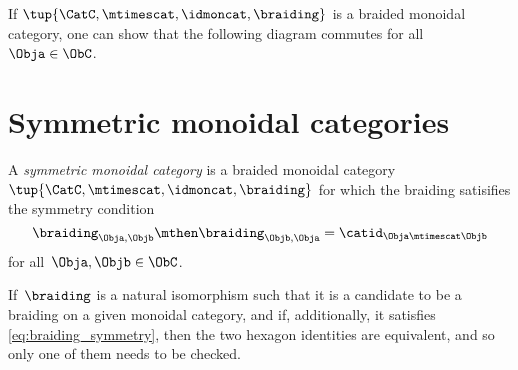 \begin{remark}
	If $\tup{\CatC,\mtimescat,\idmoncat, \braiding}$ is a braided monoidal category, one can show that the following diagram commutes for all~$\Obja \in \ObC$.
	\begin{center}
	\end{center}
\end{remark}

\section{Symmetric monoidal categories}

\begin{ctdefinition}
	\label{def:sym-mon-cat}
	A \emph{symmetric monoidal category} is a braided monoidal category~$\tup{\CatC,\mtimescat,\idmoncat, \braiding}$ for which the braiding satisifies the symmetry condition
	\begin{equation}
		\label{eq:braiding-symmetry}
		\braiding_{\Obja,\Objb} \mthen \braiding_{\Objb,\Obja} = \catid_{\Obja \mtimescat \Objb}
	\end{equation}
	for all~$\Obja, \Objb \in \ObC$.
\end{ctdefinition}

\begin{remark}
	If~$\braiding$ is a natural isomorphism such that it is a candidate to be a braiding on a given monoidal category, and if, additionally, it satisfies \cref{eq:braiding_symmetry}, then the two hexagon identities are equivalent, and so only one of them needs to be checked.
\end{remark}
